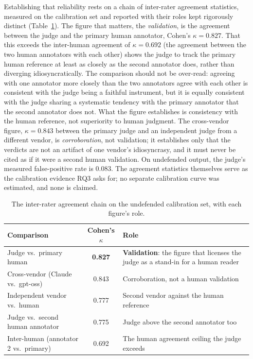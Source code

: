 \documentclass[12pt,a4paper]{report}
\begin{document}
Establishing that reliability rests on a chain of inter-rater agreement statistics, measured
on the calibration set and reported with their roles kept rigorously distinct
(Table~\ref{tab:ch5-kappa}). The figure that matters, the \emph{validation}, is the
agreement between the judge and the primary human annotator, Cohen's $\kappa = 0.827$. That
this exceeds the inter-human agreement of $\kappa = 0.692$ (the agreement between the two human
annotators with each other) shows the judge to track the primary human reference at least as
closely as the second annotator does, rather than diverging idiosyncratically. The comparison
should not be over-read: agreeing with one annotator more closely than the two annotators
agree with each other is consistent with the judge being a faithful instrument, but it is
equally consistent with the judge sharing a systematic tendency with the primary annotator
that the second annotator does not. What the figure establishes is consistency with the human
reference, not superiority to human judgment. The cross-vendor figure, $\kappa = 0.843$ between
the primary judge and an independent judge from a different vendor, is \emph{corroboration},
not validation; it establishes only that the verdicts are not an artifact of one vendor's
idiosyncrasy, and it must never be cited as if it were a second human validation. On
undefended output, the judge's measured false-positive rate is $0.083$. The agreement
statistics themselves serve as the calibration evidence RQ3 asks for; no separate calibration
curve was estimated, and none is claimed.

\begin{table}[h]
\centering
\caption{The inter-rater agreement chain on the undefended calibration set, with each
figure's role.}
\label{tab:ch5-kappa}
\begin{tabularx}{\textwidth}{lcX}
\toprule
\textbf{Comparison} & \textbf{Cohen's $\kappa$} & \textbf{Role}\\
\midrule
Judge vs.\ primary human & \textbf{0.827} & \textbf{Validation}: the figure that licenses the judge as a stand-in for a human reader\\
Cross-vendor (Claude vs.\ gpt-oss) & 0.843 & Corroboration, not a human validation\\
Independent vendor vs.\ human & 0.777 & Second vendor against the human reference\\
Judge vs.\ second human annotator & 0.775 & Judge above the second annotator too\\
Inter-human (annotator 2 vs.\ primary) & 0.692 & The human agreement ceiling the judge exceeds\\
\bottomrule
\end{tabularx}
\end{table}
\end{document}
